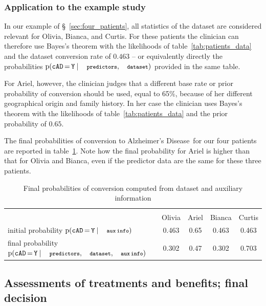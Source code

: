 \documentclass[utf8]{FrontiersinHarvard} %
\newcommand*{\mo}[1][=]{\mathord{\,#1\,}}
\newcommand*{\sect}{\S}%
\newcommand*{\p}{\mathrm{p}}%
\renewcommand*{\|}[1][]{\nonscript\:#1\vert\nonscript\:\mathopen{}}
\newcommand*{\cad}{\texttt{cAD}}
\newcommand*{\yes}{\texttt{Y}}
\newcommand*{\predictors}{\texttt{\footnotesize predictors}}
\newcommand*{\dataset}{\texttt{\footnotesize dataset}}
\newcommand*{\auxinfo}{\texttt{\footnotesize aux\,info}}
\newcommand*{\ad}{Alzheimer's Disease}
\begin{document}
\subsubsection{Application to the example study}
\label{sec:posterior_application}

In our example of \sect~\ref{sec:four_patients}, all statistics of the dataset are considered relevant for Olivia, Bianca, and Curtis. For these patients the clinician can therefore use Bayes's theorem with the likelihoods of table~\ref{tab:patients_data} and the dataset conversion rate of $0.463$ -- or equivalently directly the probabilities $\p(\cad\mo\yes \| \predictors, \dataset)$ provided in the same table.

For Ariel, however, the clinician judges that a different base rate or prior probability of conversion should be used, equal to 65\%, because of her different geographical origin and family history. In her case the clinician uses Bayes's theorem with the likelihoods of table~\ref{tab:patients_data} and the prior probability of $0.65$.

The final probabilities of conversion to \ad\ for our four patients are reported in table~\ref{tab:posterior_patients}. Note how the final probability for Ariel is higher than that for Olivia and Bianca, even if the predictor data are the same for these three patients.

\medskip
\begin{table}[!h]
  \centering
  \begin{tabular}{lcccc}
    \hline\\[-1.5\jot]
    &{\small Olivia} &{\small Ariel} &{\small Bianca} &{\small Curtis}
    \\[\jot]
    {\small initial probability\; $\p(\cad\mo\yes \| \auxinfo)$}&
    0.463&0.65&0.463&0.463
    \\[\jot]
    {\small final probability\; $\p(\cad\mo\yes \| \predictors, \dataset, \auxinfo)$}&
    0.302&0.47&0.302&0.703
    \\[\jot]
    \hline
  \end{tabular}
    \caption{Final probabilities of conversion computed from dataset and auxiliary information}\label{tab:posterior_patients}
\end{table}


\bigskip%
\subsection{Assessments of treatments and benefits; final decision}
\label{sec:utilities_step}
\end{document}
